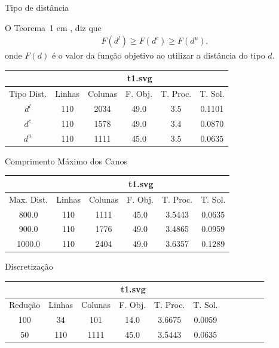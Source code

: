 \documentclass[11pt]{beamer}
\begin{document}
\begin{frame}{Tipo de distância}
\begin{block}{}
O Teorema~1 em \cite{Andjel:1989:TP}, diz que
\begin{align*}
    F(d^l) \geq F(d^c) \geq F(d^u),
\end{align*}
onde $F(d)$ é o valor da função objetivo ao utilizar a distância do tipo $d$.
\end{block}

\begin{table}
    \centering
    \begin{tabular}{|c|c|c|c|c|c|}
        \hline
        & \multicolumn{5}{|c|}{t1.svg}  \\ \hline
        Tipo Dist. & Linhas & Colunas & F. Obj. & T. Proc. & T. Sol. \\ \hline
        $d^l$ & 110 & 2034 & 49.0 & 3.5 & 0.1101 \\ \hline
        $d^c$ & 110 & 1578 & 49.0 & 3.4 & 0.0870 \\ \hline
        $d^u$ & 110 & 1111 & 45.0 & 3.5 & 0.0635 \\ \hline
    \end{tabular}        
\end{table}
\end{frame}

\begin{frame}{Comprimento Máximo dos Canos}
\begin{table}
    \centering
    \begin{tabular}{|c|c|c|c|c|c|}
        \hline
        & \multicolumn{5}{|c|}{t1.svg} \\ \hline
        Max. Dist. & Linhas & Colunas & F. Obj. & T. Proc. & T. Sol.  \\ \hline
        800.0 & 110 & 1111 & 45.0 & 3.5443 & 0.0635  \\ \hline
        900.0 & 110 & 1776 & 49.0 & 3.4865 & 0.0959  \\ \hline
        1000.0 & 110 & 2404 & 49.0 & 3.6357 & 0.1289  \\ \hline
    \end{tabular}
\end{table}
\end{frame}

\begin{frame}{Discretização}
\begin{table}
    \centering
    \begin{tabular}{|c|c|c|c|c|c|c|c|c|c|c|}
        \hline
        & \multicolumn{5}{|c|}{t1.svg}  \\ \hline
        Redução & Linhas & Colunas & F. Obj. & T. Proc. & T. Sol. \\ \hline
        100 & 34 & 101 & 14.0 & 3.6675 & 0.0059 \\ \hline
        50 & 110 & 1111 & 45.0 & 3.5443 & 0.0635 \\ \hline
    \end{tabular}
\end{table}
\end{frame}
\end{document}
